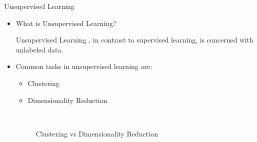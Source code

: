 \documentclass[compress,oilve]{beamer}
\newcommand{\tc}[2]{
	\textcolor{#1}{\hspace{-2pt}#2\hspace{-2pt}}
}
\begin{document}
\begin{frame}{Unsupervised Learning}
	\begin{itemize}
	\item \tc{keywords}{What is Unsupervised Learning?}\\
	\medskip
	
	\tc{keywords}{Unsupervised Learning}, in contrast to supervised learning, is concerned with unlabeled data. 
	
	\medskip
	\item Common tasks in unsupervised learning are:
	
	\begin{itemize}
		\item \tc{keywords}{Clustering}  
		\item \tc{keywords}{Dimensionality Reduction}
	\end{itemize}
	
	\begin{figure}[htbp!]
		\qquad
		\\
		
		\tiny
		\caption{Clustering vs Dimensionality Reduction}
		\label{fig:globalfigure2}
		
	\end{figure}
	
	\end{itemize}
\end{frame}
\end{document}
